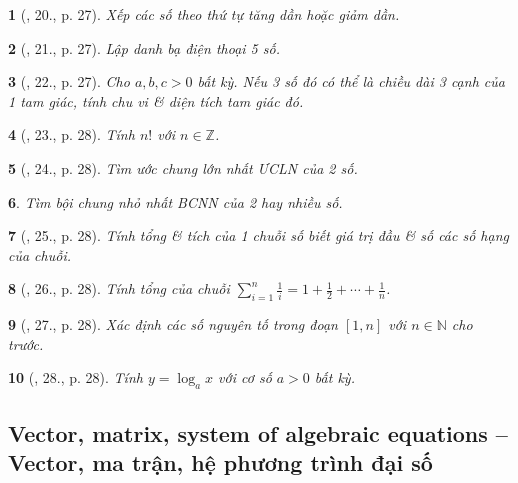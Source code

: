 \documentclass{article}
\newtheorem{baitoan}{}
\begin{document}
\begin{baitoan}[\cite{Doanh_Tuan_Pascal}, 20., p. 27]
	Xếp các số theo thứ tự tăng dần hoặc giảm dần.
\end{baitoan}

\begin{baitoan}[\cite{Doanh_Tuan_Pascal}, 21., p. 27]
	Lập danh bạ điện thoại 5 số.
\end{baitoan}

\begin{baitoan}[\cite{Doanh_Tuan_Pascal}, 22., p. 27]
	Cho $a,b,c > 0$ bất kỳ. Nếu 3 số đó có thể là chiều dài 3 cạnh của 1 tam giác, tính chu vi \& diện tích tam giác đó.
\end{baitoan}

\begin{baitoan}[\cite{Doanh_Tuan_Pascal}, 23., p. 28]
	Tính $n!$ với $n\in\mathbb{Z}$.
\end{baitoan}

\begin{baitoan}[\cite{Doanh_Tuan_Pascal}, 24., p. 28]
	Tìm ước chung lớn nhất {\rm ƯCLN} của 2 số.
\end{baitoan}

\begin{baitoan}
	Tìm bội chung nhỏ nhất {\rm BCNN} của 2 hay nhiều số.
\end{baitoan}

\begin{baitoan}[\cite{Doanh_Tuan_Pascal}, 25., p. 28]
	Tính tổng \& tích của 1 chuỗi số biết giá trị đầu \& số các số hạng của chuỗi.
\end{baitoan}

\begin{baitoan}[\cite{Doanh_Tuan_Pascal}, 26., p. 28]
	Tính tổng của chuỗi $\sum_{i=1}^n \frac{1}{i} = 1 + \frac{1}{2} + \cdots + \frac{1}{n}$.
\end{baitoan}

\begin{baitoan}[\cite{Doanh_Tuan_Pascal}, 27., p. 28]
	Xác định các số nguyên tố trong đoạn $[1,n]$ với $n\in\mathbb{N}$ cho trước.
\end{baitoan}

\begin{baitoan}[\cite{Doanh_Tuan_Pascal}, 28., p. 28]
	Tính $y = \log_a x$ với cơ số $a > 0$ bất kỳ.
\end{baitoan}


\subsection{Vector, matrix, system of algebraic equations -- Vector, ma trận, hệ phương trình đại số}
\end{document}
